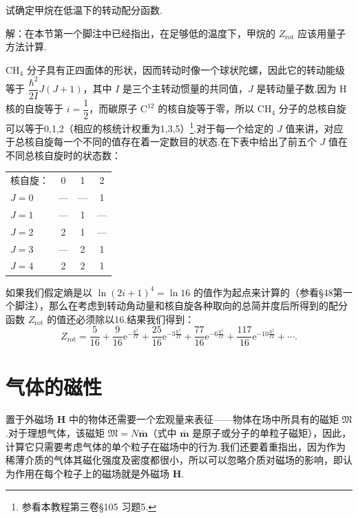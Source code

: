 \begin{xiti}

\quad 试确定甲烷在低温下的转动配分函数.

解：在本节第一个脚注中已经指出，在足够低的温度下，甲烷的 $Z_{\mathrm{rot}}$ 应该用量子方法计算.

$\mathrm{CH}_4$ 分子具有正四面体的形状，因而转动时像一个球状陀螺，因此它的转动能级等于 $\dfrac{\hbar^2}{2I}J(J+1)$，其中 $I$ 是三个主转动惯量的共同值，$J$ 是转动量子数.因为 H 核的自旋等于 $i=\dfrac{1}{2}$，而碳原子 $\mathrm{C}^{12}$ 的核自旋等于零，所以 $\mathrm{CH}_4$ 分子的总核自旋可以等于0,1,2（相应的核统计权重为1,3,5）\footnote{参看本教程第三卷§105 习题5.}.对于每一个给定的 $J$ 值来讲，对应于总核自旋每一个不同的值存在着一定数目的状态.在下表中给出了前五个 $J$ 值在不同总核自旋时的状态数：

\begin{center}
\begin{tabular}{lccc}
核自旋： & 0 & 1 & 2 \\
$J=0$ & — & — & 1 \\
$J=1$ & — & 1 & — \\
$J=2$ & 2 & 1 & — \\
$J=3$ & — & 2 & 1 \\
$J=4$ & 2 & 2 & 1
\end{tabular}
\end{center}

如果我们假定熵是以 $\ln(2i+1)^4=\ln16$ 的值作为起点来计算的（参看§48第一个脚注），那么在考虑到转动角动量和核自旋各种取向的总简并度后所得到的配分函数 $Z_{\mathrm{rot}}$ 的值还必须除以16.结果我们得到：
\begin{equation*}
  Z_{\mathrm{rot}}=\frac{5}{16}+\frac{9}{16}\mathrm{e}^{-\frac{\hbar^2}{IT}}
  +\frac{25}{16}\mathrm{e}^{-3\frac{\hbar^2}{IT}}
  +\frac{77}{16}\mathrm{e}^{-6\frac{\hbar^2}{IT}}
  +\frac{117}{16}\mathrm{e}^{-10\frac{\hbar^2}{IT}}+\cdots.
\end{equation*}

\end{xiti}

\section{气体的磁性}

置于外磁场 $\boldsymbol{H}$ 中的物体还需要一个宏观量来表征——物体在场中所具有的磁矩 $\mathfrak{M}$.对于理想气体，该磁矩 $\mathfrak{M}=N\bar{\boldsymbol{m}}$（式中 $\bar{\boldsymbol{m}}$ 是原子或分子的单粒子磁矩），因此，计算它只需要考虑气体的单个粒子在磁场中的行为.我们还要着重指出，因为作为稀薄介质的气体其磁化强度及密度都很小，所以可以忽略介质对磁场的影响，即认为作用在每个粒子上的磁场就是外磁场 $\boldsymbol{H}$.

